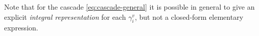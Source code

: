 \documentclass[onecolumn]{IEEEtran}
\newtheorem{example}[theorem]{Example}
\begin{document}
 Note that for the cascade \eqref{eq:cascade-general} 
 it is possible in general to give an explicit \emph{integral representation} for each $\gamma_i^v$, but not   a closed-form elementary expression.

\end{document}
